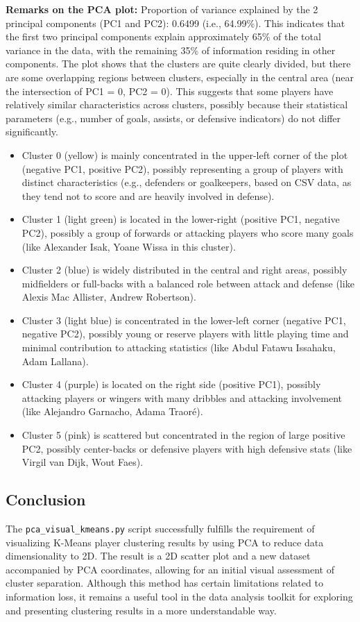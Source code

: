 \documentclass[12pt, a4paper]{report}
\begin{document}
\textbf{Remarks on the PCA plot:}
Proportion of variance explained by the 2 principal components (PC1 and PC2): 0.6499 (i.e., 64.99\%).
This indicates that the first two principal components explain approximately 65\% of the total variance in the data, with the remaining 35\% of information residing in other components.
The plot shows that the clusters are quite clearly divided, but there are some overlapping regions between clusters, especially in the central area (near the intersection of PC1 = 0, PC2 = 0).
This suggests that some players have relatively similar characteristics across clusters, possibly because their statistical parameters (e.g., number of goals, assists, or defensive indicators) do not differ significantly.
\begin{itemize}
    \item Cluster 0 (yellow) is mainly concentrated in the upper-left corner of the plot (negative PC1, positive PC2), possibly representing a group of players with distinct characteristics (e.g., defenders or goalkeepers, based on CSV data, as they tend not to score and are heavily involved in defense).
    \item Cluster 1 (light green) is located in the lower-right (positive PC1, negative PC2), possibly a group of forwards or attacking players who score many goals (like Alexander Isak, Yoane Wissa in this cluster).
    \item Cluster 2 (blue) is widely distributed in the central and right areas, possibly midfielders or full-backs with a balanced role between attack and defense (like Alexis Mac Allister, Andrew Robertson).
    \item Cluster 3 (light blue) is concentrated in the lower-left corner (negative PC1, negative PC2), possibly young or reserve players with little playing time and minimal contribution to attacking statistics (like Abdul Fatawu Issahaku, Adam Lallana).
    \item Cluster 4 (purple) is located on the right side (positive PC1), possibly attacking players or wingers with many dribbles and attacking involvement (like Alejandro Garnacho, Adama Traoré).
    \item Cluster 5 (pink) is scattered but concentrated in the region of large positive PC2, possibly center-backs or defensive players with high defensive stats (like Virgil van Dijk, Wout Faes).
\end{itemize}

\subsection{Conclusion} %
The \texttt{pca\_visual\_kmeans.py} script successfully fulfills the requirement of visualizing K-Means player clustering results by using PCA to reduce data dimensionality to 2D.
The result is a 2D scatter plot and a new dataset accompanied by PCA coordinates, allowing for an initial visual assessment of cluster separation.
Although this method has certain limitations related to information loss, it remains a useful tool in the data analysis toolkit for exploring and presenting clustering results in a more understandable way.
\end{document}
